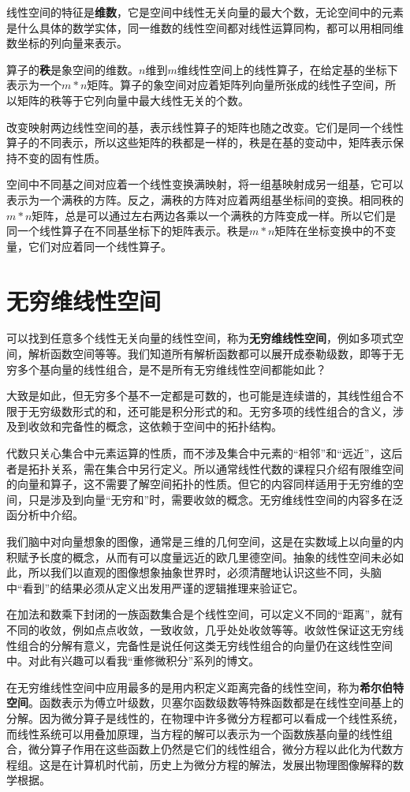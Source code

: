 	线性空间的特征是\textbf{维数}，它是空间中线性无关向量的最大个数，无论空间中的元素是什么具体的数学实体，同一维数的线性空间都对线性运算同构，都可以用相同维数坐标的列向量来表示。
	
	算子的\textbf{秩}是象空间的维数。$ n $维到$ m $维线性空间上的线性算子，在给定基的坐标下表示为一个$ m*n $矩阵。算子的象空间对应着矩阵列向量所张成的线性子空间，所以矩阵的秩等于它列向量中最大线性无关的个数。
	
	改变映射两边线性空间的基，表示线性算子的矩阵也随之改变。它们是同一个线性算子的不同表示，所以这些矩阵的秩都是一样的，秩是在基的变动中，矩阵表示保持不变的固有性质。
	
	空间中不同基之间对应着一个线性变换满映射，将一组基映射成另一组基，它可以表示为一个满秩的方阵。反之，满秩的方阵对应着两组基坐标间的变换。相同秩的$ m*n $矩阵，总是可以通过左右两边各乘以一个满秩的方阵变成一样。所以它们是同一个线性算子在不同基坐标下的矩阵表示。秩是$ m*n $矩阵在坐标变换中的不变量，它们对应着同一个线性算子。
	
	\section{无穷维线性空间}
	
	可以找到任意多个线性无关向量的线性空间，称为\textbf{无穷维线性空间}，例如多项式空间，解析函数空间等等。我们知道所有解析函数都可以展开成泰勒级数，即等于无穷多个基向量的线性组合，是不是所有无穷维线性空间都能如此？
	
	大致是如此，但无穷多个基不一定都是可数的，也可能是连续谱的，其线性组合不限于无穷级数形式的和，还可能是积分形式的和。无穷多项的线性组合的含义，涉及到收敛和完备性的概念，这依赖于空间中的拓扑结构。
	
	代数只关心集合中元素运算的性质，而不涉及集合中元素的``相邻''和``远近''，这后者是拓扑关系，需在集合中另行定义。所以通常线性代数的课程只介绍有限维空间的向量和算子，这不需要了解空间拓扑的性质。但它的内容同样适用于无穷维的空间，只是涉及到向量``无穷和''时，需要收敛的概念。无穷维线性空间的内容多在泛函分析中介绍。
	
	我们脑中对向量想象的图像，通常是三维的几何空间，这是在实数域上以向量的内积赋予长度的概念，从而有可以度量远近的欧几里德空间。抽象的线性空间未必如此，所以我们以直观的图像想象抽象世界时，必须清醒地认识这些不同，头脑中``看到''的结果必须从定义出发用严谨的逻辑推理来验证它。
	
	在加法和数乘下封闭的一族函数集合是个线性空间，可以定义不同的``距离''，就有不同的收敛，例如点点收敛，一致收敛，几乎处处收敛等等。收敛性保证这无穷线性组合的分解有意义，完备性是说任何这类无穷线性组合的向量仍在这线性空间中。对此有兴趣可以看我``重修微积分''系列的博文。
	
	在无穷维线性空间中应用最多的是用内积定义距离完备的线性空间，称为\textbf{希尔伯特空间}。函数表示为傅立叶级数，贝塞尔函数级数等特殊函数都是在线性空间基上的分解。因为微分算子是线性的，在物理中许多微分方程都可以看成一个线性系统，而线性系统可以用叠加原理，当方程的解可以表示为一个函数族基向量的线性组合，微分算子作用在这些函数上仍然是它们的线性组合，微分方程以此化为代数方程组。这是在计算机时代前，历史上为微分方程的解法，发展出物理图像解释的数学根据。